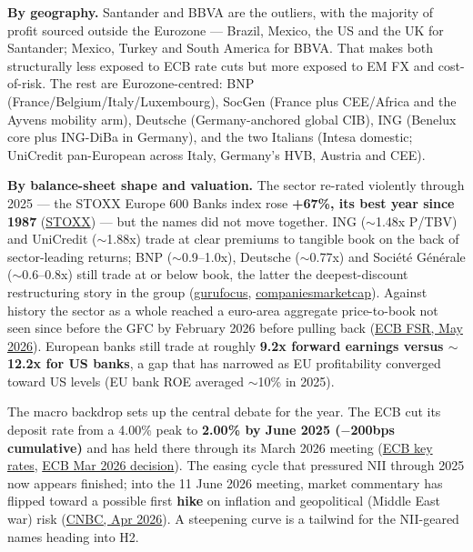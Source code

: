\documentclass[10pt,a4paper]{article}
\begin{document}
\textbf{By geography.} Santander and BBVA are the outliers, with the majority of profit sourced outside the Eurozone --- Brazil, Mexico, the US and the UK for Santander; Mexico, Turkey and South America for BBVA. That makes both structurally less exposed to ECB rate cuts but more exposed to EM FX and cost-of-risk. The rest are Eurozone-centred: BNP (France/Belgium/Italy/Luxembourg), SocGen (France plus CEE/Africa and the Ayvens mobility arm), Deutsche (Germany-anchored global CIB), ING (Benelux core plus ING-DiBa in Germany), and the two Italians (Intesa domestic; UniCredit pan-European across Italy, Germany's HVB, Austria and CEE).

\textbf{By balance-sheet shape and valuation.} The sector re-rated violently through 2025 --- the STOXX Europe 600 Banks index rose \textbf{+67\%, its best year since 1987} (\href{https://stoxx.com/european-bank-stocks-have-record-year-lifting-sector-stoxx-etf-assets-above-eur-13bn/}{STOXX}) --- but the names did not move together. ING ($\sim$1.48x P/TBV) and UniCredit ($\sim$1.88x) trade at clear premiums to tangible book on the back of sector-leading returns; BNP ($\sim$0.9--1.0x), Deutsche ($\sim$0.77x) and Soci\'et\'e G\'en\'erale ($\sim$0.6--0.8x) still trade at or below book, the latter the deepest-discount restructuring story in the group (\href{https://www.gurufocus.com/term/pb/XAMS:INGA}{gurufocus}, \href{https://companiesmarketcap.com/deutsche-bank/}{companiesmarketcap}). Against history the sector as a whole reached a euro-area aggregate price-to-book not seen since before the GFC by February 2026 before pulling back (\href{https://www.ecb.europa.eu/press/financial-stability-publications/fsr/focus/2026/html/ecb.fsrbox202605_03~ae5ac7a1de.en.html}{ECB FSR, May 2026}). European banks still trade at roughly \textbf{9.2x forward earnings versus $\sim$12.2x for US banks}, a gap that has narrowed as EU profitability converged toward US levels (EU bank ROE averaged $\sim$10\% in 2025).

The macro backdrop sets up the central debate for the year. The ECB cut its deposit rate from a 4.00\% peak to \textbf{2.00\% by June 2025 ($-$200bps cumulative)} and has held there through its March 2026 meeting (\href{https://www.ecb.europa.eu/stats/policy_and_exchange_rates/key_ecb_interest_rates/html/index.en.html}{ECB key rates}, \href{https://www.ecb.europa.eu/press/pr/date/2026/html/ecb.mp260319~3057739775.en.html}{ECB Mar 2026 decision}). The easing cycle that pressured NII through 2025 now appears finished; into the 11 June 2026 meeting, market commentary has flipped toward a possible first \textbf{hike} on inflation and geopolitical (Middle East war) risk (\href{https://www.cnbc.com/2026/04/30/european-central-bank-april-2026-rate-decision-inflation-stagflation-risk-iran-war.html}{CNBC, Apr 2026}). A steepening curve is a tailwind for the NII-geared names heading into H2.
\end{document}
